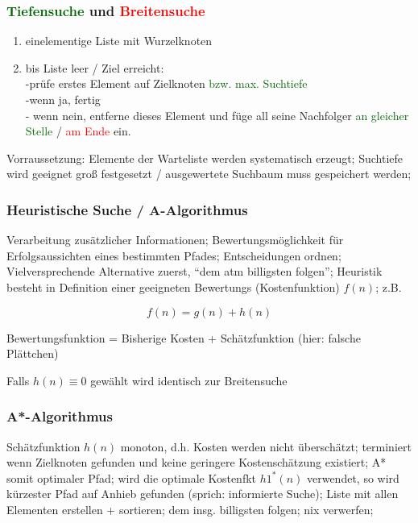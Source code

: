 \documentclass[german,color,6pt]{latex4ei/latex4ei_sheet}
\begin{document}
\begin{sectionbox}
\subsubsection{\textcolor{darkgreen}{Tiefensuche} und \textcolor{red}{Breitensuche}}
\begin{enumerate}
	\item einelementige Liste mit Wurzelknoten
	\item bis Liste leer / Ziel erreicht: \\ -prüfe erstes Element auf Zielknoten \textcolor{darkgreen}{bzw. max. Suchtiefe} \\-wenn ja, fertig \\ - wenn nein, entferne dieses Element und füge all seine Nachfolger \textcolor{darkgreen}{ an gleicher Stelle} / \textcolor{red}{am Ende} ein.
\end{enumerate}

Vorraussetzung: Elemente der Warteliste werden systematisch erzeugt; Suchtiefe wird geeignet groß festgesetzt / ausgewertete Suchbaum muss gespeichert werden; 
\end{sectionbox}

\begin{sectionbox}
\subsubsection{Heuristische Suche / A-Algorithmus}
Verarbeitung zusätzlicher Informationen; Bewertungsmöglichkeit für Erfolgsaussichten eines bestimmten Pfades; Entscheidungen ordnen; Vielversprechende Alternative zuerst, "`dem atm billigsten folgen"'; Heuristik besteht in Definition einer geeigneten Bewertungs (Kostenfunktion) $f(n)$; z.B.

\begin{equation*}
f(n) = g(n) + h(n)
\end{equation*}

Bewertungsfunktion = Bisherige Kosten + Schätzfunktion (hier: falsche Plättchen)

Falls $h(n) \equiv 0$ gewählt wird identisch zur Breitensuche
\end{sectionbox}

\begin{sectionbox}
\subsubsection{A*-Algorithmus}
Schätzfunktion $h(n)$ monoton, d.h. Kosten werden nicht überschätzt; terminiert wenn Zielknoten gefunden und keine geringere Kostenschätzung existiert; A* somit optimaler Pfad; wird die optimale Kostenfkt $h1^*(n)$ verwendet, so wird kürzester Pfad auf Anhieb gefunden (sprich: informierte Suche); Liste mit allen Elementen erstellen + sortieren; dem insg. billigsten folgen; nix verwerfen; 
\end{sectionbox}
\end{document}
